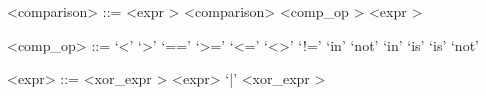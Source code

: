 \label{comparisonb}

\begin{grammar}
<comparison> ::= <expr \myref[exprb]>
	\alt <comparison> <comp_op \myref[compzzzopb]> <expr \myref[exprb]>
\end{grammar}


\label{compzzzopb}

\begin{grammar}
<comp_op> ::= `<'
	\alt `>'
	\alt `=='
	\alt `>='
	\alt `<='
	\alt `<>'
	\alt `!='
	\alt `in'
	\alt `not' `in'
	\alt `is'
	\alt `is' `not'
\end{grammar}


\label{exprb}

\begin{grammar}
<expr> ::= <xor_expr \myref[xorzzzexprb]>
	\alt <expr> `|' <xor_expr \myref[xorzzzexprb]>
\end{grammar}


